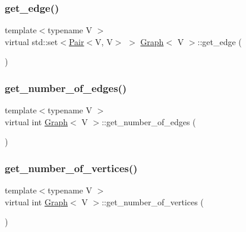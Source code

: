 \mbox{\label{classGraph_a847d814a578284a8077a48a3d3b0f489}} 
\subsubsection{\texorpdfstring{get\+\_\+edge()}{get\_edge()}}
{\footnotesize\ttfamily template$<$typename V $>$ \\
virtual std\+::set$<$\hyperlink{classPair}{Pair}$<$V, V$>$ $>$ \hyperlink{classGraph}{Graph}$<$ V $>$\+::get\+\_\+edge (\begin{DoxyParamCaption}{ }\end{DoxyParamCaption})\hspace{0.3cm}{\ttfamily [virtual]}}

\mbox{\label{classGraph_a9ea6293e51579980dd72efdf2886bb31}} 
\subsubsection{\texorpdfstring{get\+\_\+number\+\_\+of\+\_\+edges()}{get\_number\_of\_edges()}}
{\footnotesize\ttfamily template$<$typename V $>$ \\
virtual int \hyperlink{classGraph}{Graph}$<$ V $>$\+::get\+\_\+number\+\_\+of\+\_\+edges (\begin{DoxyParamCaption}{ }\end{DoxyParamCaption})\hspace{0.3cm}{\ttfamily [virtual]}}

\mbox{\label{classGraph_a034497a7f3c868e808e21a1e19cf9f7b}} 
\subsubsection{\texorpdfstring{get\+\_\+number\+\_\+of\+\_\+vertices()}{get\_number\_of\_vertices()}}
{\footnotesize\ttfamily template$<$typename V $>$ \\
virtual int \hyperlink{classGraph}{Graph}$<$ V $>$\+::get\+\_\+number\+\_\+of\+\_\+vertices (\begin{DoxyParamCaption}{ }\end{DoxyParamCaption})\hspace{0.3cm}{\ttfamily [virtual]}}

